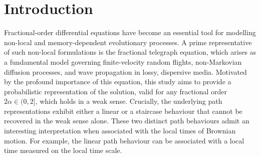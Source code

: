 \documentclass[10pt,a4paper]{article}
\numberwithin{equation}{section}
\theoremstyle{plain}
\theoremstyle{remark}
\begin{document}
\tableofcontents

\newpage

\section{Introduction}

Fractional-order differential equations have become an essential tool for modelling non-local and memory-dependent evolutionary processes. A prime representative of such non-local formulations is the fractional telegraph equation, which arises as a fundamental model governing finite-velocity random flights, non-Markovian diffusion processes, and wave propagation in lossy, dispersive media. Motivated by the profound importance of this equation, this study aims to provide a probabilistic representation of the solution, valid for any fractional order $2\alpha \in (0,2]$, which holds in a weak sense. Crucially, the underlying path representations exhibit either a linear or a staircase behaviour that cannot be recovered in the weak sense alone. These two distinct path behaviours admit an interesting interpretation when associated with the local times of Brownian motion. For example, the linear path behaviour can be associated with a local time measured on the local time scale. 
\end{document}
